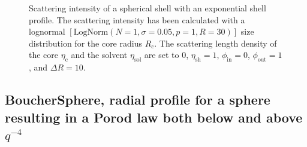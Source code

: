 \begin{figure}[htb]
\captionsetup[subfigure]{position=b}
\centering
{}
\hfill
{}
\caption{Scattering intensity of a spherical shell with an exponential shell profile. The scattering intensity has been calculated
with a lognormal $[\mathrm{LogNorm}(N\!=\!1,\sigma\!=\!0.05,p\!=\!1,R\!=\!30)]$ size distribution for the core radius $R_c$.
The scattering length density of the core $\eta_\text{c}$ and the solvent $\eta_\text{sol}$ are set to 0, $\eta_\text{sh}=1$,
$\phi_\text{in}=0$,  $\phi_\text{out}=1$, and $\Delta R =10$.}
\label{fig:ExpShellExample}
\end{figure}


\clearpage
\subsection{BoucherSphere, radial profile for a sphere resulting in a Porod law both below and above $q^{-4}$}
\label{sect:BoucherSphere} ~\\


